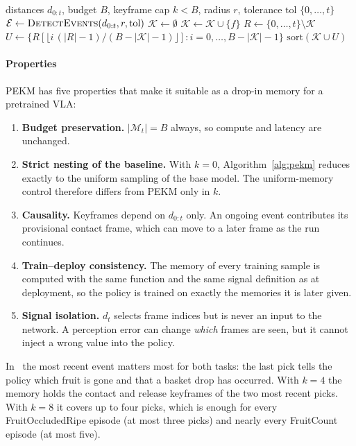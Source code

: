 \begin{algorithm}[t]
\caption{PEKM selection at decision time $t$}
\label{alg:pekm}
\begin{algorithmic}[1]
\Require distances $d_{0:t}$, budget $B$, keyframe cap $k<B$, radius $r$, tolerance $\mathrm{tol}$
 \Return $\{0,\dots,t\}$ \EndIf
\State $\mathcal{E} \gets \textsc{DetectEvents}(d_{0:t}, r, \mathrm{tol})$ 
\State $\mathcal{K} \gets \emptyset$
     $\mathcal{K} \gets \mathcal{K} \cup \{f\}$ \EndIf
  \EndFor
\EndFor
\State $R \gets \{0,\dots,t\} \setminus \mathcal{K}$ 
\State $U \gets \{R[\lfloor i\,(|R|-1)/(B-|\mathcal{K}|-1) \rfloor] : i = 0,\dots,B-|\mathcal{K}|-1\}$ 
\State \Return $\mathrm{sort}(\mathcal{K} \cup U)$
\end{algorithmic}
\end{algorithm}

\paragraph{Properties} PEKM has five properties that make it suitable as a drop-in memory for a pretrained VLA:
\begin{enumerate}
\item \textbf{Budget preservation.} $|\mathcal{M}_t| = B$ always, so compute and latency are unchanged.
\item \textbf{Strict nesting of the baseline.} With $k=0$, Algorithm~\ref{alg:pekm} reduces exactly to the uniform sampling of the base model. The uniform-memory control therefore differs from PEKM only in $k$.
\item \textbf{Causality.} Keyframes depend on $d_{0:t}$ only. An ongoing event contributes its provisional contact frame, which can move to a later frame as the run continues.
\item \textbf{Train--deploy consistency.} The memory of every training sample is computed with the same function and the same signal definition as at deployment, so the policy is trained on exactly the memories it is later given.
\item \textbf{Signal isolation.} $d_t$ selects frame indices but is never an input to the network. A perception error can change \emph{which} frames are seen, but it cannot inject a wrong value into the policy.
\end{enumerate}
In \bench\ the most recent event matters most for both tasks: the last pick tells the policy which fruit is gone and that a basket drop has occurred. With $k=4$ the memory holds the contact and release keyframes of the two most recent picks. With $k=8$ it covers up to four picks, which is enough for every FruitOccludedRipe episode (at most three picks) and nearly every FruitCount episode (at most five).

